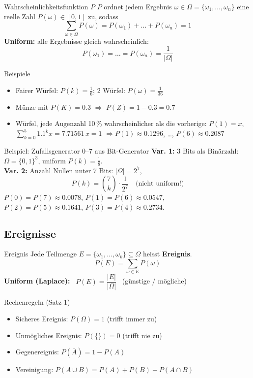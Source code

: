 \documentclass[a4paper, fontsize=7pt]{scrartcl}
\begin{document}
\begin{mainbox}{Wahrscheinlichkeitsfunktion $P$}
$P$ ordnet jedem Ergebnis $\omega \in \Omega = \{\omega_1, \ldots, \omega_n\}$
eine reelle Zahl $P(\omega) \in [0,1]$ zu, sodass
$$\boxed{\sum_{\omega \in \Omega} P(\omega) = P(\omega_1) + \ldots + P(\omega_n) = 1}$$
\textbf{Uniform:} alle Ergebnisse gleich wahrscheinlich:
$$P(\omega_1) = \ldots = P(\omega_n) = \frac{1}{|\Omega|}$$
\end{mainbox}

\begin{subbox}{Beispiele}
\begin{itemize}
    \item Fairer Würfel: $P(k) = \frac{1}{6}$; 2 Würfel: $P(\omega) = \frac{1}{36}$
    \item Münze mit $P(K) = 0.3$ $\Rightarrow$ $P(Z) = 1 - 0.3 = 0.7$
    \item Würfel, jede Augenzahl 10\,\% wahrscheinlicher als die vorherige:
          $P(1) = x$, $\sum_{k=0}^{5} 1.1^k x = 7.71561\,x = 1$
          $\Rightarrow P(1) \approx 0.1296$, \ldots, $P(6) \approx 0.2087$
\end{itemize}
\end{subbox}

\begin{subbox}{Beispiel: Zufallsgenerator 0--7 aus Bit-Generator}
\textbf{Var. 1:} 3 Bits als Binärzahl: $\Omega = \{0,1\}^3$, uniform
$P(k) = \frac{1}{8}$.\\
\textbf{Var. 2:} Anzahl Nullen unter 7 Bits: $|\Omega| = 2^7$,
$$P(k) = \binom{7}{k} \cdot \frac{1}{2^7} \quad \text{(nicht uniform!)}$$
$P(0) = P(7) \approx 0.0078$, $P(1) = P(6) \approx 0.0547$,\\
$P(2) = P(5) \approx 0.1641$, $P(3) = P(4) \approx 0.2734$.
\end{subbox}

\subsection{Ereignisse}

\begin{mainbox}{Ereignis}
Jede Teilmenge $E = \{\omega_1, \ldots, \omega_k\} \subseteq \Omega$ heisst
\textbf{Ereignis}.
$$\boxed{P(E) = \sum_{\omega \in E} P(\omega)}$$
\textbf{Uniform (Laplace):} \ $P(E) = \dfrac{|E|}{|\Omega|}$
\ (günstige / mögliche)
\end{mainbox}

\begin{mainbox}{Rechenregeln (Satz 1)}
\begin{itemize}
    \item Sicheres Ereignis: $P(\Omega) = 1$ (trifft immer zu)
    \item Unmögliches Ereignis: $P(\{\}) = 0$ (trifft nie zu)
    \item Gegenereignis: $P(\overline{A}) = 1 - P(A)$
    \item Vereinigung:
          $P(A \cup B) = P(A) + P(B) - P(A \cap B)$
\end{itemize}
\end{mainbox}
\end{document}
